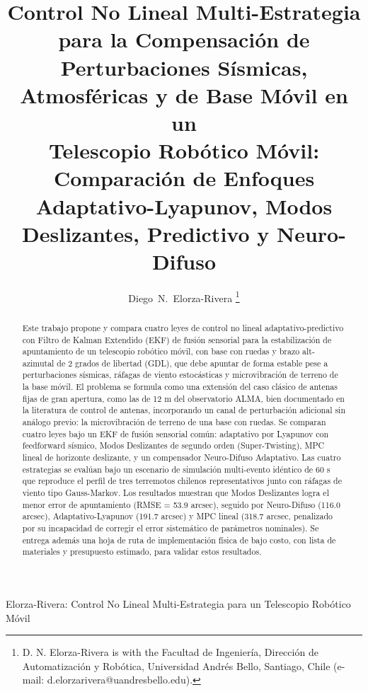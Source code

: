 \documentclass[journal]{IEEEtran}
\begin{document}
\title{Control No Lineal Multi-Estrategia para la Compensación de\\
Perturbaciones Sísmicas, Atmosféricas y de Base Móvil en un\\
Telescopio Robótico Móvil: Comparación de Enfoques\\
Adaptativo-Lyapunov, Modos Deslizantes, Predictivo y Neuro-Difuso}

\author{Diego~N.~Elorza-Rivera
\thanks{D. N. Elorza-Rivera is with the Facultad de Ingeniería, Dirección
de Automatización y Robótica, Universidad Andrés Bello, Santiago, Chile
(e-mail: d.elorzarivera@uandresbello.edu).}}

%
{Elorza-Rivera: Control No Lineal Multi-Estrategia para un Telescopio Robótico Móvil}

\maketitle

\begin{abstract}
Este trabajo propone y compara cuatro leyes de control no lineal
adaptativo-predictivo con Filtro de Kalman Extendido (EKF) de fusión
sensorial para la estabilización de apuntamiento de un telescopio
robótico móvil, con base con ruedas y brazo alt-azimutal de 2 grados de
libertad (GDL), que debe apuntar de forma estable pese a perturbaciones
sísmicas, ráfagas de viento estocásticas y microvibración de terreno de
la base móvil.
El problema se formula como una extensión del caso clásico de antenas
fijas de gran apertura, como las de 12 m del observatorio ALMA, bien
documentado en la literatura de control de antenas, incorporando un canal
de perturbación adicional sin análogo previo: la microvibración de
terreno de una base con ruedas. Se comparan cuatro leyes bajo un EKF de
fusión sensorial común: adaptativo por Lyapunov con feedforward sísmico,
Modos Deslizantes de segundo orden (Super-Twisting), MPC lineal de
horizonte deslizante, y un compensador Neuro-Difuso Adaptativo. Las
cuatro estrategias se evalúan bajo un escenario de simulación
multi-evento idéntico de 60 s que reproduce el perfil de tres terremotos
chilenos representativos junto con ráfagas de viento tipo Gauss-Markov.
Los resultados muestran que Modos Deslizantes logra el menor error de
apuntamiento (RMSE = 53.9 arcsec), seguido por Neuro-Difuso (116.0
arcsec), Adaptativo-Lyapunov (191.7 arcsec) y MPC lineal (318.7 arcsec,
penalizado por su incapacidad de corregir el error sistemático de
parámetros nominales). Se entrega además una hoja de ruta de
implementación física de bajo costo, con lista de materiales y
presupuesto estimado, para validar estos resultados.
\end{abstract}
\end{document}
